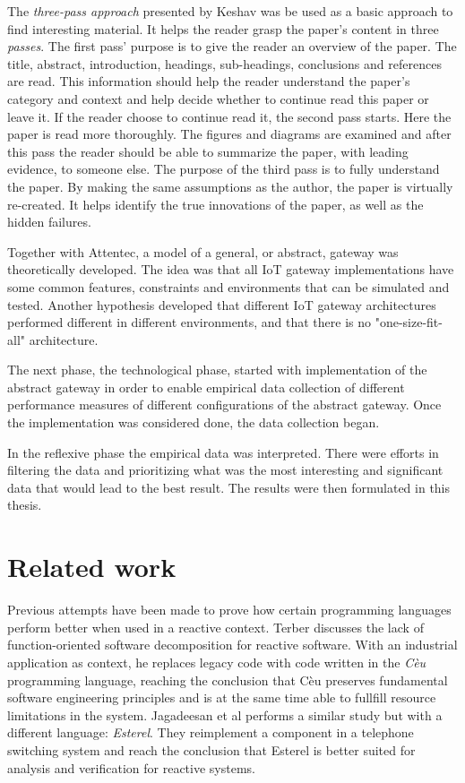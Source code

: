 The \textit{three-pass approach} presented by Keshav \cite{keshav2007read} was
be used as a basic approach to find interesting material. It helps the reader
grasp the paper's content in three \textit{passes}. The first pass' purpose is
to give the reader an overview of the paper. The title, abstract, introduction,
headings, sub-headings, conclusions and references are read. This information
should help the reader understand the paper's category and context and help
decide whether to continue read this paper or leave it. If the reader choose to
continue read it, the second pass starts. Here the paper is read more
thoroughly. The figures and diagrams are examined and after this pass the
reader should be able to summarize the paper, with leading evidence, to someone
else. The purpose of the third pass is to fully understand the paper. By making
the same assumptions as the author, the paper is virtually re-created. It helps
identify the true innovations of the paper, as well as the hidden failures.

Together with Attentec, a model of a general, or abstract, gateway was
theoretically developed. The idea was that all IoT gateway implementations have
some common features, constraints and environments that can be simulated and
tested. Another hypothesis developed that different IoT gateway architectures
performed different in different environments, and that there is no
"one-size-fit-all" architecture.

The next phase, the technological phase, started with implementation of the
abstract gateway in order to enable empirical data collection of different
performance measures of different configurations of the abstract gateway. Once
the implementation was considered done, the data collection began.

In the reflexive phase the empirical data was interpreted. There were efforts
in filtering the data and prioritizing what was the most interesting and
significant data that would lead to the best result. The results were then
formulated in this thesis.

\section{Related work}

Previous attempts have been made to prove how certain programming languages
perform better when used in a reactive context. Terber
\cite{terber2017function} discusses the lack of function-oriented software
decomposition for reactive software. With an industrial application as context,
he replaces legacy code with code written in the \textit{Cèu} programming
language, reaching the conclusion that Cèu preserves fundamental software
engineering principles and is at the same time able to fullfill resource
limitations in the system. Jagadeesan et al \cite{jagadeesan1996formal}
performs a similar study but with a different language: \textit{Esterel}. They
reimplement a component in a telephone switching system and reach the
conclusion that Esterel is better suited for analysis and verification for
reactive systems.

